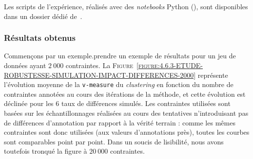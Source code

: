 			\begin{leftBarInformation}
				Les scripts de l'expérience, réalisés avec des \textit{notebooks} Python (\cite{van-rossum-drake:2009:python-reference-manual}), sont disponibles dans un dossier dédié de~\cite{schild:2021:cognitivefactory-interactiveclusteringcomparativestudy}.
			\end{leftBarInformation}
		
		
		\subsubsection{Résultats obtenus}
			
			Commençons par un exemple.prendre un exemple de résultats pour un jeu de données ayant $2~000$ contraintes.
			La \textsc{Figure~\ref{figure:4.6.3-ETUDE-ROBUSTESSE-SIMULATION-IMPACT-DIFFERENCES-2000}} représente l'évolution moyenne de la \texttt{v-measure} du \textit{clustering} en fonction du nombre de contraintes annotées au cours des itérations de la méthode, et cette évolution est déclinée pour les $6$ taux de différences simulés.
			Les contraintes utilisées sont basées sur les échantillonnages réalisées au cours des tentatives n'introduisant pas de différences d'annotation par rapport à la vérité terrain : comme les mêmes contraintes sont donc utilisées (aux valeurs d'annotations près), toutes les courbes sont comparables point par point.
			Dans un soucis de lisibilité, nous avons toutefois tronqué la figure à $20~000$ contraintes.


